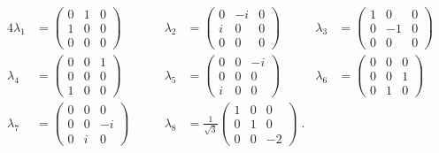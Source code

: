 \documentclass[a4paper,10pt]{article}
\begin{document}
\begin{alignat*}{4}
 \lambda_1 &= \left(
	      \begin{array}{ccc}
	      0 & 1 & 0 \\
	      1 & 0 & 0 \\
	      0 & 0 & 0
	      \end{array}
	      \right) \qquad&
 \lambda_2 &= \left(
	      \begin{array}{ccc}
	       0 & -i & 0 \\
	       i & 0 & 0 \\
	       0 & 0 & 0
	       \end{array}
	       \right) \qquad&
 \lambda_3 &= \left(
	      \begin{array}{ccc}
	      1 & 0 & 0 \\
	      0 & -1 & 0 \\
	      0 & 0 & 0
	      \end{array}
	      \right) \\[1ex]
 \lambda_4 &= \left(
	      \begin{array}{ccc}
	      0 & 0 & 1 \\
	      0 & 0 & 0 \\
	      1 & 0 & 0
	      \end{array}
	      \right) \qquad&
 \lambda_5 &= \left(
	      \begin{array}{ccc}
	      0 & 0 & -i \\
	      0 & 0 & 0 \\
	      i & 0 & 0
	      \end{array}
	      \right) \qquad&
 \lambda_6 &= \left(
	      \begin{array}{ccc}
	      0 & 0 & 0 \\
	      0 & 0 & 1 \\
	      0 & 1 & 0
	      \end{array}
	      \right) \\[1ex]
 \lambda_7 &= \left(
	      \begin{array}{ccc}
	      0 & 0 & 0 \\
	      0 & 0 & -i \\
	      0 & i & 0
	      \end{array}
	      \right) \qquad&
 \lambda_8 &= \frac{1}{\sqrt{3}}\left(
	      \begin{array}{ccc}
	      1 & 0 & 0 \\
	      0 & 1 & 0 \\
	      0 & 0 & -2
	      \end{array}
	      \right)\;.
\end{alignat*}
\end{document}
